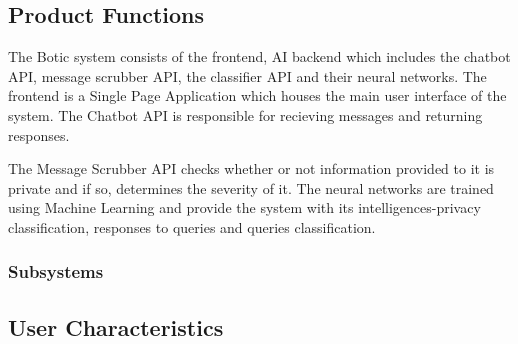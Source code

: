 \documentclass[11pt]{article}
\begin{document}


\subsection{Product Functions}%

The Botic system consists of the frontend, AI backend which includes the chatbot API, message scrubber API, the classifier API and their neural networks. The frontend is a Single Page Application which houses the main user interface of the system. The Chatbot API is responsible for recieving messages and returning responses.\par

The Message Scrubber API checks whether or not information provided to it is private and if so, determines the severity of it. The neural networks are trained using Machine Learning and provide the system with its intelligences-privacy classification, responses to queries and queries classification.

\subsubsection{Subsystems}

\subsection{User Characteristics}
\end{document}
